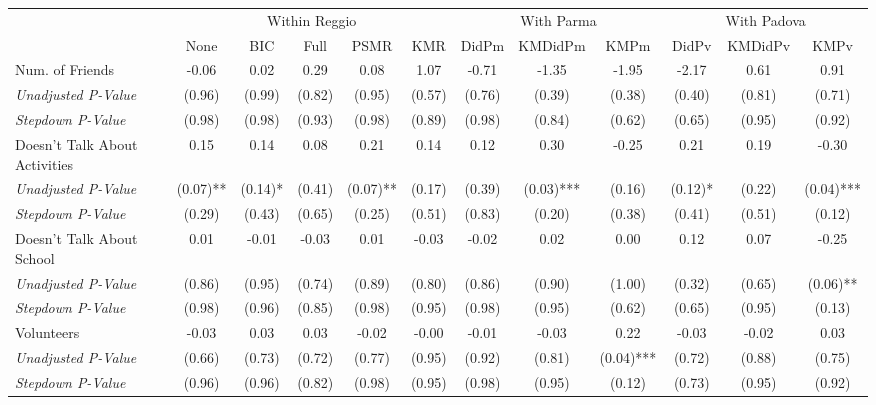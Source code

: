 \begin{tabular}{l c c c c c c c c c c c}
\toprule
& \multicolumn{5}{c}{Within Reggio} & \multicolumn{3}{c}{With Parma} & \multicolumn{3}{c}{With Padova} \\\cmidrule(lr){2-6} \cmidrule(lr){7-9} \cmidrule(lr){10-12}
 & None & BIC & Full & PSMR & KMR & DidPm & KMDidPm & KMPm & DidPv & KMDidPv & KMPv \\
\midrule
Num. of Friends & -0.06 & 0.02 & 0.29 & 0.08 & 1.07 & -0.71 & -1.35 & -1.95 & -2.17 & 0.61 & 0.91 \\
\quad \textit{Unadjusted P-Value} & (0.96) & (0.99) & (0.82) & (0.95) & (0.57) & (0.76) & (0.39) & (0.38) & (0.40) & (0.81) & (0.71) \\
\quad \textit{Stepdown P-Value} & (0.98) & (0.98) & (0.93) & (0.98) & (0.89) & (0.98) & (0.84) & (0.62) & (0.65) & (0.95) & (0.92) \\
Doesn't Talk About Activities & 0.15 & 0.14 & 0.08 & 0.21 & 0.14 & 0.12 & 0.30 & -0.25 & 0.21 & 0.19 & -0.30 \\
\quad \textit{Unadjusted P-Value} & (0.07)** & (0.14)* & (0.41) & (0.07)** & (0.17) & (0.39) & (0.03)*** & (0.16) & (0.12)* & (0.22) & (0.04)*** \\
\quad \textit{Stepdown P-Value} & (0.29) & (0.43) & (0.65) & (0.25) & (0.51) & (0.83) & (0.20) & (0.38) & (0.41) & (0.51) & (0.12) \\
Doesn't Talk About School & 0.01 & -0.01 & -0.03 & 0.01 & -0.03 & -0.02 & 0.02 & 0.00 & 0.12 & 0.07 & -0.25 \\
\quad \textit{Unadjusted P-Value} & (0.86) & (0.95) & (0.74) & (0.89) & (0.80) & (0.86) & (0.90) & (1.00) & (0.32) & (0.65) & (0.06)** \\
\quad \textit{Stepdown P-Value} & (0.98) & (0.96) & (0.85) & (0.98) & (0.95) & (0.98) & (0.95) & (0.62) & (0.65) & (0.95) & (0.13) \\
Volunteers & -0.03 & 0.03 & 0.03 & -0.02 & -0.00 & -0.01 & -0.03 & 0.22 & -0.03 & -0.02 & 0.03 \\
\quad \textit{Unadjusted P-Value} & (0.66) & (0.73) & (0.72) & (0.77) & (0.95) & (0.92) & (0.81) & (0.04)*** & (0.72) & (0.88) & (0.75) \\
\quad \textit{Stepdown P-Value} & (0.96) & (0.96) & (0.82) & (0.98) & (0.95) & (0.98) & (0.95) & (0.12) & (0.73) & (0.95) & (0.92) \\
\bottomrule
\end{tabular}
